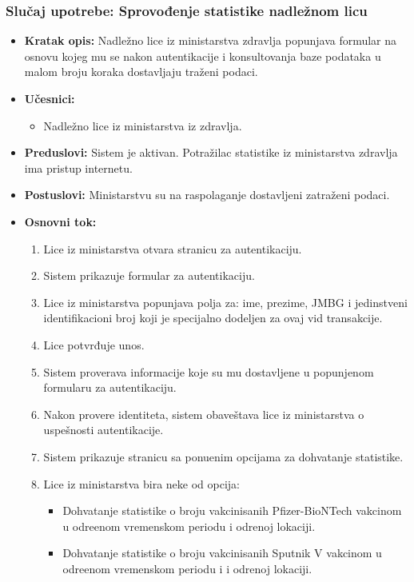 \documentclass[titlepage]{article}
\begin{document}
\subsubsection{Slučaj upotrebe: Sprovođenje statistike nadle\v{z}nom licu}
\begin{itemize}
\item \textbf{Kratak opis:}  Nadle\v{z}no lice iz ministarstva zdravlja popunjava formular na osnovu kojeg mu se nakon autentikacije i konsultovanja baze podataka u malom broju koraka dostavljaju tra\v{z}eni podaci.
\item \textbf{Učesnici:}
\begin{itemize}
    \item Nadle\v{z}no lice iz ministarstva iz zdravlja.
\end{itemize}
 \item \textbf{Preduslovi:} Sistem je aktivan. Potra\v{z}ilac statistike iz ministarstva zdravlja ima pristup internetu.
 \item \textbf{Postuslovi:} Ministarstvu su na raspolaganje dostavljeni zatra\v{z}eni podaci.
 \item \textbf{Osnovni tok:}
 \begin{enumerate}
    \item Lice iz ministarstva otvara stranicu za autentikaciju.
    \item Sistem prikazuje formular za autentikaciju.
    \item Lice iz ministarstva popunjava polja za: ime, prezime, JMBG i jedinstveni identifikacioni broj koji je specijalno dodeljen za ovaj vid transakcije.
    \item Lice potvrđuje unos.
    \item Sistem proverava informacije koje su mu dostavljene u popunjenom formularu za autentikaciju.
    \item Nakon provere identiteta, sistem obave\v{s}tava lice iz ministarstva o uspe\v{s}nosti autentikacije.
    \item Sistem prikazuje stranicu sa ponu\dj{}enim opcijama za dohvatanje statistike.
    \item Lice iz ministarstva bira neke od opcija:
    \begin{itemize}
                    \item Dohvatanje statistike o broju vakcinisanih Pfizer-BioNTech vakcinom u odre\dj{}enom vremenskom periodu i odre\dj{}noj lokaciji.
                    \item Dohvatanje statistike o broju vakcinisanih Sputnik V vakcinom u odre\dj{}enom vremenskom periodu i i odre\dj{}noj lokaciji.

\end{itemize}
\end{enumerate}
\end{itemize}
\end{document}
